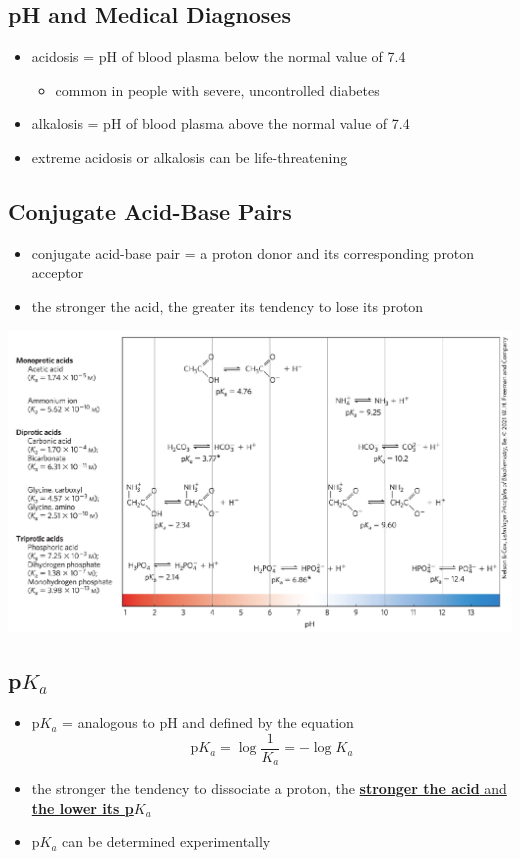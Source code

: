 \documentclass[10pt]{article}
\begin{document}
\subsection*{pH and Medical Diagnoses}
\begin{itemize}
    \item acidosis = pH of blood plasma below the normal value of 7.4
    \begin{itemize}
        \item common in people with severe, uncontrolled diabetes
    \end{itemize}
    \item alkalosis = pH of blood plasma above the normal value of 7.4
    \item extreme acidosis or alkalosis can be life-threatening
\end{itemize}
\subsection*{Conjugate Acid-Base Pairs}
\begin{itemize}
    \item conjugate acid-base pair = a proton donor and its corresponding proton acceptor
    \item the stronger the acid, the greater its tendency to lose its proton
\end{itemize}
\begin{center}
    \includegraphics[width=\textwidth]{L3_5.png}
\end{center}
\subsection*{p$K_a$}
\begin{itemize}
    \item p$K_a$ = analogous to pH and defined by the equation
    \[\text{p}K_a = \log\frac{1}{K_a} = -\log K_a\]
    \item the stronger the tendency to dissociate a proton, the \underline{\textbf{stronger the acid} and \textbf{the lower its p$K_a$}}
    \item p$K_a$ can be determined experimentally
\end{itemize}
\end{document}
